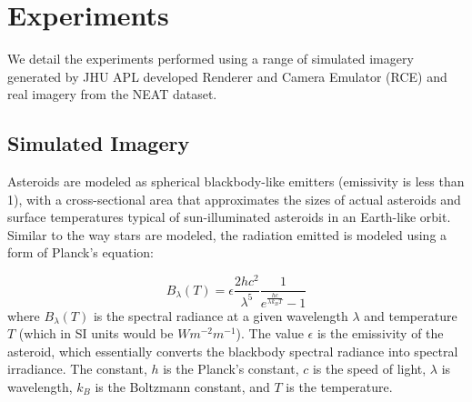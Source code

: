\section{Experiments}
%
%
%
%
%

\label{sec:experiments}

We detail the experiments performed using a range of simulated imagery generated by JHU APL developed Renderer and Camera Emulator (RCE) and real imagery from the NEAT dataset.  


\subsection{Simulated Imagery}
\label{ssec:simulated}

Asteroids are  modeled as spherical blackbody-like emitters (emissivity is less than 1), with a cross-sectional area that approximates the sizes of actual asteroids and surface temperatures typical of sun-illuminated asteroids in an Earth-like orbit.  Similar to the way stars are modeled, the radiation emitted is modeled using a form of Planck's equation:

\begin{equation}
\label{eq:Planck}
B_\lambda(T)= \epsilon	\frac{2hc^2}{\lambda^5} \frac{1}{e^{\frac{hc}{\lambda k_BT}} - 1}
\end{equation}
 where $B_\lambda(T)$ is the spectral radiance at a given wavelength $\lambda$ and temperature $T$ (which in SI units would be $Wm^{-2} m^{-1}$). The value $\epsilon$ is the emissivity of the asteroid, which essentially converts the blackbody spectral radiance into spectral irradiance. The constant, $h$ is the Planck's constant, $c$ is the speed of light, $\lambda$ is wavelength, $k_B$ is the Boltzmann constant, and $T$ is the temperature. 
 
